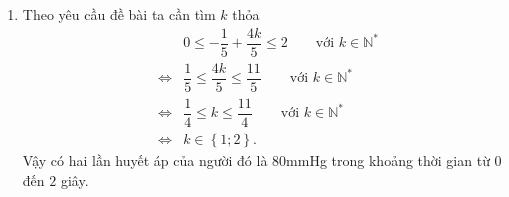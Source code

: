 \begin{bt}
{\begin{enumerate}
			\item Theo yêu cầu đề bài ta cần tìm $k$ thỏa \begin{eqnarray*}
				&&0\leq -\dfrac{1}{5} + \dfrac{4k}{5} \leq 2 \qquad\text{với } k\in \mathbb{N^*}\\
				&\Leftrightarrow& \dfrac{1}{5} \leq \dfrac{4k}{5} \leq \dfrac{11}{5} \qquad\text{với } k\in \mathbb{N^*}\\
				&\Leftrightarrow&\dfrac{1}{4} \leq k \leq \dfrac{11}{4} \qquad\text{với } k\in \mathbb{N^*}\\
				&\Leftrightarrow& k \in \left\{1;2\right\}.
			\end{eqnarray*}
			Vậy có hai lần huyết áp của người đó là $80$mmHg trong khoảng thời gian từ $0$ đến $2$ giây.
		\end{enumerate}
	}
\end{bt}

